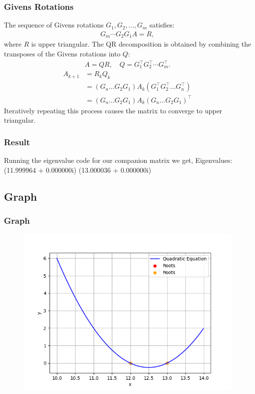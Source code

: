 \documentclass{beamer}
\theoremstyle{remark}
\numberwithin{equation}{section}
\begin{document}
      \begin{frame}
        \frametitle{Givens Rotations}
        The sequence of Givens rotations $G_1, G_2, \dots, G_m$ satisfies:
        \begin{align}
          G_m \cdots G_2 G_1 A = R,
        \end{align}
        where \(R\) is upper triangular. The QR decomposition is obtained by combining the transposes of the Givens rotations into \(Q\):
        \begin{align}
          A = Q R, \quad Q = G_1^{\top} G_2^{\top} \cdots G_m^{\top}.
        \end{align}
        \begin{align}
          A_{k+1}&= R_k Q_k\\
          &=(G_n \dots G_2 G_1)A_k(G_1^{\top}G_2^{\top}\dots G_n^{\top})\\
          &= (G_n \dots G_2 G_1)A_k(G_n \dots G_2 G_1)^{\top}
        \end{align}
        Iteratively repeating this process causes the matrix to converge to upper triangular.
      \end{frame}
      \begin{frame}
        \frametitle{Result}
Running the eigenvalue code for our companion matrix we get,
Eigenvalues:
(11.999964 + 0.000000i) 
(13.000036 + 0.000000i)
      \end{frame}
\subsection{Graph}
      \begin{frame}[fragile]
        \frametitle{Graph}
        \begin{figure}[h!]
          \centering
          \includegraphics[width=1\columnwidth]{figs/fig.png}
          \label{stemplot}
        \end{figure}
      \end{frame}
    
\end{document}
